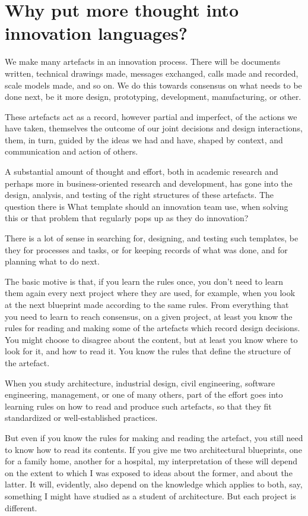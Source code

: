 \section{Why put more thought into innovation languages?}
\label{c1-s11}
We make many artefacts in an innovation process. There will be documents written, technical drawings made, messages exchanged, calls made and recorded, scale models made, and so on. We do this towards consensus on what needs to be done next, be it more design, prototyping, development, manufacturing, or other.

These artefacts act as a record, however partial and imperfect, of the actions we have taken, themselves the outcome of our joint decisions and design interactions, them, in turn, guided by the ideas we had and have, shaped by context, and communication and action of others. 

A substantial amount of thought and effort, both in academic research and perhaps more in business-oriented research and development, has gone into the design, analysis, and testing of the right structures of these artefacts. The question there is What template should an innovation team use, when solving this or that problem that regularly pops up as they do innovation? 

There is a lot of sense in searching for, designing, and testing such templates, be they for processes and tasks, or for keeping records of what was done, and for planning what to do next. 

The basic motive is that, if you learn the rules once, you don't need to learn them again every next project where they are used, for example, when you look at the next blueprint made according to the same rules. From everything that you need to learn to reach consensus, on a given project, at least you know the rules for reading and making some of the artefacts which record design decisions. You might choose to disagree about the content, but at least you know where to look for it, and how to read it. You know the rules that define the structure of the artefact.

When you study architecture, industrial design, civil engineering, software engineering, management, or one of many others, part of the effort goes into learning rules on how to read and produce such artefacts, so that they fit standardized or well-established practices. 

But even if you know the rules for making and reading the artefact, you still need to know how to read its contents. If you give me two architectural blueprints, one for a family home, another for a hospital, my interpretation of these will depend on the extent to which I was exposed to ideas about the former, and about the latter. It will, evidently, also depend on the knowledge which applies to both, say, something I might have studied as a student of architecture. But each project is different. 

